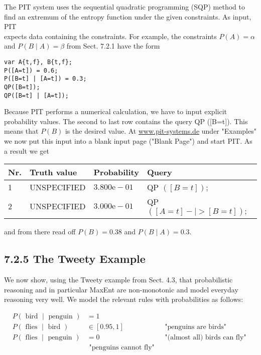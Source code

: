\documentclass[10pt]{article}
\begin{document}
The PIT system uses the sequential quadratic programming (SQP) method to find an extremum of the entropy function under the given constraints. As input, PIT\\
expects data containing the constraints. For example, the constraints $P(A)=\alpha$ and $P(B \mid A)=\beta$ from Sect. 7.2.1 have the form

\begin{verbatim}
var A{t,f}, B{t,f};
P([A=t]) = 0.6;
P([B=t] | [A=t]) = 0.3;
QP([B=t]);
QP([B=t] | [A=t]);
\end{verbatim}

Because PIT performs a numerical calculation, we have to input explicit probability values. The second to last row contains the query QP ([B=t]). This means that $P(B)$ is the desired value. At \href{http://www.pit-systems.de}{www.pit-systems.de} under "Examples" we now put this input into a blank input page ("Blank Page") and start PIT. As a result we get

\begin{center}
\begin{tabular}{llll}
\hline
Nr. & Truth value & Probability & Query \\
\hline
1 & UNSPECIFIED & $3.800 \mathrm{e}-01$ & QP $([B=t]) ;$ \\
\hline
2 & UNSPECIFIED & $3.000 \mathrm{e}-01$ & QP $([A=t]-\mid>[B=t]) ;$ \\
\hline
\end{tabular}
\end{center}

and from there read off $P(B)=0.38$ and $P(B \mid A)=0.3$.

\subsection*{7.2.5 The Tweety Example}
We now show, using the Tweety example from Sect. 4.3, that probabilistic reasoning and in particular MaxEnt are non-monotonic and model everyday reasoning very well. We model the relevant rules with probabilities as follows:

$$
\begin{array}{lll}
P(\text { bird } \mid \text { penguin }) & =1 & \\
P(\text { flies } \mid \text { bird }) & \in[0.95,1] & \text { "penguins are birds" } \\
P(\text { flies } \mid \text { penguin }) & =0 & \text { "(almost all) birds can fly" } \\
& \text { "penguins cannot fly" }
\end{array}
$$
\end{document}
